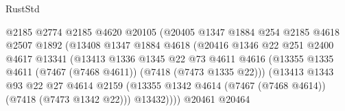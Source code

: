 \begin{lexlean}{RustStd}
\begin{coremodule}
                                      @2185
                                      @2774
                                      @2185
                                      @4620
                                      @20105
                                      (@20405
                                        @1347
                                        @1884
                                        @254
                                        @2185
                                        @4618
                                        @2507
                                        @1892
                                        (@13408
                                          @1347
                                          @1884
                                          @4618
                                          (@20416
                                            @1346
                                            @22
                                            @251
                                            @2400
                                            @4617
                                            @13341
                                            (@13413
                                              @1336
                                              @1345
                                              @22
                                              @73
                                              @4611
                                              @4616
                                              (@13355
                                                @1335
                                                @4611
                                                (@7467 (@7468 @4611))
                                                (@7418 (@7473 @1335 @22)))
                                              (@13413
                                                @1343
                                                @93
                                                @22
                                                @27
                                                @4614
                                                @2159
                                                (@13355
                                                  @1342
                                                  @4614
                                                  (@7467 (@7468 @4614))
                                                  (@7418 (@7473 @1342 @22)))
                                                @13432))))
                                        @20461
                                        @20464

\end{coremodule}
\end{lexlean}
